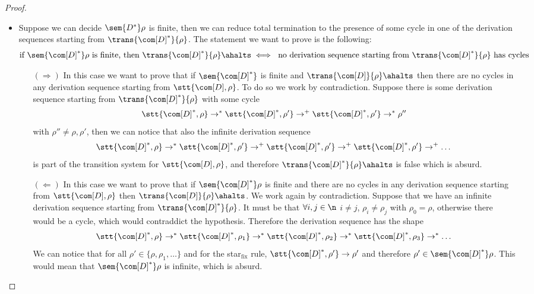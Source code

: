 \begin{proof}
\begin{itemize}
  \item Suppose we can decide \(\sem{D^*}\rho\) is finite, then we can
    reduce total termination to the presence of some cycle in one of
    the derivation sequences starting from
    \(\trans{\com[D]^*}{\rho}\). The statement we want to prove is the
    following:
    \begin{equation*}
      \text{if }\sem{\com[D]^*}\rho \text{ is finite, then } \trans{\com[D]^*}{\rho} \ahalts \iff \text{ no derivation sequence starting from } \trans{\com[D]^*}{\rho} \text{ has cycles}
    \end{equation*}
    \begin{itemize}
    \item[\((\Rightarrow)\)] In this case we want to prove that if
      \(\sem{\com[D]^*}\) is finite and
      \(\trans{\com[D]}{\rho} \ahalts\) then there are no cycles in
      any derivation sequence starting from \(\stt{\com[D],
        \rho}\). To do so we work by contradiction. Suppose there is
      some derivation sequence starting from
      \(\trans{\com[D]^*}{\rho}\) with some cycle
      \begin{equation*}
        \stt{\com[D]^*, \rho} \to^* \stt{\com[D]^*, \rho'} \to^+ \stt{\com[D]^*, \rho'} \to^* \rho''
      \end{equation*}
      with \(\rho''\neq \rho, \rho'\), then we can notice that also
      the infinite derivation sequence
      \begin{equation*}
        \stt{\com[D]^*, \rho} \to^* \stt{\com[D]^*, \rho'} \to^+ \stt{\com[D]^*, \rho'} \to^+ \stt{\com[D]^*, \rho'} \to^+ \dots
      \end{equation*}
      is part of the transition system for \(\stt{\com[D], \rho}\),
      and therefore \(\trans{\com[D]^*}{\rho} \ahalts\) is false which
      is absurd.
    \item[\((\Leftarrow)\)] In this case we want to prove that if
      \(\sem{\com[D]^*}\rho\) is finite and there are no cycles in any
      derivation sequence starting from \(\stt{\com[D], \rho}\) then
      \(\trans{\com[D]}{\rho} \ahalts\). We work again by
      contradiction. Suppose that we have an infinite derivation
      sequence starting from \(\trans{\com[D]^*}{\rho}\). It must be
      that \(\forall i,j \in \n\) \(i \neq j\), \(\rho_i \neq \rho_j\)
      with \(\rho_0 = \rho\), otherwise there would be a cycle, which
      would contraddict the hypothesis. Therefore the derivation
      sequence has the shape
      \begin{equation*}
        \stt{\com[D]^*, \rho} \to^* \stt{\com[D]^*, \rho_1} \to^* \stt{\com[D]^*, \rho_2} \to^* \stt{\com[D]^*, \rho_3} \to^* \dots
      \end{equation*}
      We can notice that for all \(\rho' \in \{\rho, \rho_1, \dots\}\)
      and for the star\(_{\text{fix}}\) rule,
      \(\stt{\com[D]^*, \rho'} \to \rho'\) and therefore
      \(\rho'\in \sem{\com[D]^*}\rho\). This would mean that
      \(\sem{\com[D]^*}\rho\) is infinite, which is absurd.
    \end{itemize}


\end{itemize}
\end{proof}
